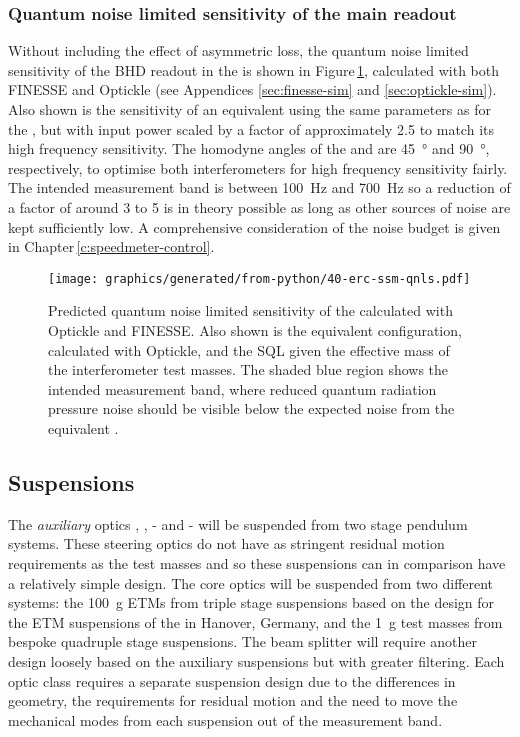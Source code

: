 \subsubsection{Quantum noise limited sensitivity of the main readout}
Without including the effect of asymmetric loss, the quantum noise limited sensitivity of the \gls{BHD} readout in the \SSMEXPT{} is shown in Figure\,\ref{fig:erc-ssm-qnls}, calculated with both \gls{FINESSE} and Optickle (see Appendices \ref{sec:finesse-sim} and \ref{sec:optickle-sim}). Also shown is the sensitivity of an equivalent \FPMI{} using the same parameters as for the \SSM{}, but with input power scaled by a factor of approximately \num{2.5} to match its high frequency sensitivity. The homodyne angles of the \SSM{} and \MI{} are \SI{45}{\degree} and \SI{90}{\degree}, respectively, to optimise both interferometers for high frequency sensitivity fairly. The intended measurement band is between \SI{100}{\hertz} and \SI{700}{\hertz} so a reduction of a factor of around \num{3} to \num{5} is in theory possible as long as other sources of noise are kept sufficiently low. A comprehensive consideration of the noise budget is given in Chapter\,\ref{c:speedmeter-control}.

\begin{figure}
  \centering
  \texttt{[image: graphics/generated/from-python/40-erc-ssm-qnls.pdf]}
  \caption[Predicted quantum noise limited sensitivity of the \SSMEXPT{}]{\label{fig:erc-ssm-qnls}Predicted quantum noise limited sensitivity of the \SSMEXPT{} calculated with Optickle and \gls{FINESSE}. Also shown is the equivalent \FPMI{} configuration, calculated with Optickle, and the \gls{SQL} given the effective mass of the interferometer test masses. The shaded blue region shows the intended measurement band, where reduced quantum radiation pressure noise should be visible below the expected noise from the equivalent \FPMI{}.}
\end{figure}

\subsection{Suspensions}
The \emph{auxiliary} optics \MFOUR{}, \MFIVE{}, \MSEVEN{}-\MTEN{} and \MTWELVE{}-\MFIFTEEN{} will be suspended from two stage pendulum systems. These steering optics do not have as stringent residual motion requirements as the test masses and so these suspensions can in comparison have a relatively simple design. The core optics will be suspended from two different systems: the \SI{100}{\gram} \glspl{ETM} from triple stage suspensions based on the design for the \gls{ETM} suspensions of the \AEIPROTOTYPE{} in Hanover, Germany, and the \SI{1}{\gram} test masses from bespoke quadruple stage suspensions. The beam splitter \MSIX{} will require another design loosely based on the auxiliary suspensions but with greater filtering. Each optic class requires a separate suspension design due to the differences in geometry, the requirements for residual motion and the need to move the mechanical modes from each suspension out of the measurement band.

